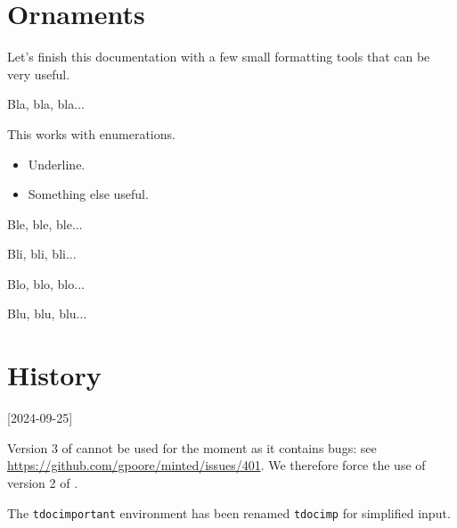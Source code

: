 \section{Ornaments}

Let's finish this documentation with a few small formatting tools that can be very useful.


\begin{tdoclatex}[sbs]
Bla, bla, bla...

\tdocsep %

This works with enumerations.

\begin{itemize}
    \item Underline.

    \item Something else useful.
\end{itemize}

\tdocsep %

Ble, ble, ble...

Bli, bli, bli...

\tdocxspace %

Blo, blo, blo...

Blu, blu, blu...

\end{tdoclatex}


\section{History}

\small

[2024-09-25]

\begin{tdocprob}
	\item Version 3 of  cannot be used for the moment as it contains bugs: see \url{https://github.com/gpoore/minted/issues/401}. We therefore force the use of version 2 of .
\end{tdocprob}


\begin{tdocbreak}
	\item The \verb#tdocimportant# environment has been renamed \verb#tdocimp# for simplified input.
\end{tdocbreak}


